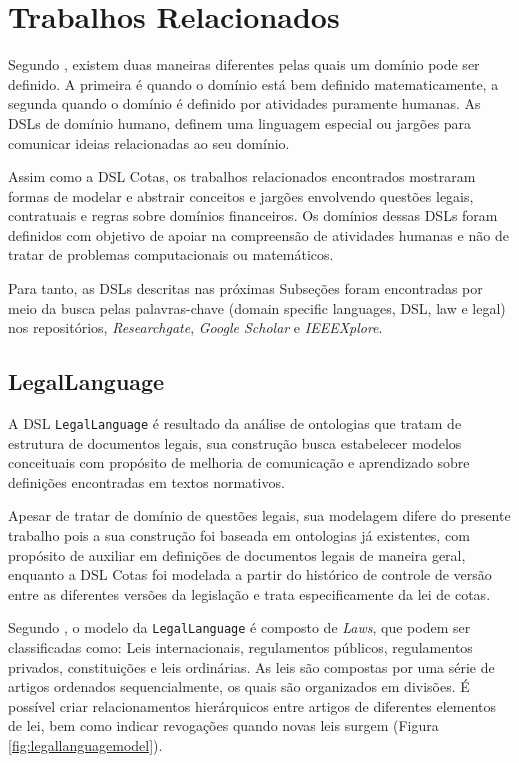 \section{Trabalhos Relacionados}
\label{subsection:trabalhoscorrelatos}
 Segundo , existem duas maneiras diferentes pelas quais um domínio pode ser definido. A primeira é quando o domínio está bem definido matematicamente, a segunda quando o domínio é definido por atividades puramente humanas. As DSLs de domínio humano, definem uma linguagem especial ou jargões para comunicar ideias relacionadas ao seu domínio.  
 
 Assim como a DSL Cotas, os trabalhos relacionados encontrados mostraram formas de modelar e abstrair conceitos e jargões envolvendo questões legais, contratuais e regras sobre domínios financeiros. Os domínios dessas DSLs foram definidos com objetivo de apoiar na compreensão de atividades humanas e não de tratar de problemas computacionais ou matemáticos.
 
 Para tanto, as DSLs descritas nas próximas Subseções foram encontradas por meio da busca pelas palavras-chave (domain specific languages, DSL, law e legal)  nos repositórios, \textit{Researchgate}, \textit{Google Scholar} e \textit{IEEEXplore}.
 
 
\subsection{LegalLanguage}
\label{legallanguage}

A DSL \texttt{LegalLanguage} é resultado da análise de ontologias que tratam de estrutura de documentos legais, sua construção busca estabelecer modelos conceituais com propósito de melhoria de comunicação e aprendizado sobre definições encontradas em textos normativos.

Apesar de tratar de domínio de questões legais, sua modelagem difere do presente trabalho pois a sua construção foi baseada em ontologias já existentes, com propósito de auxiliar em definições de documentos legais de maneira geral, enquanto a DSL Cotas foi modelada a partir do histórico de controle de versão entre as diferentes versões da legislação e trata especificamente da lei de cotas. 



Segundo , o modelo da \texttt{LegalLanguage} é composto de \textit{Laws}, que podem ser classificadas como: Leis internacionais, regulamentos públicos, regulamentos privados, constituições e leis ordinárias. As leis são compostas por uma série de artigos ordenados sequencialmente, os quais são organizados em divisões. É possível criar relacionamentos hierárquicos entre artigos de diferentes elementos de lei, bem como indicar revogações quando novas leis surgem (Figura \ref{fig:legallanguagemodel}). 


